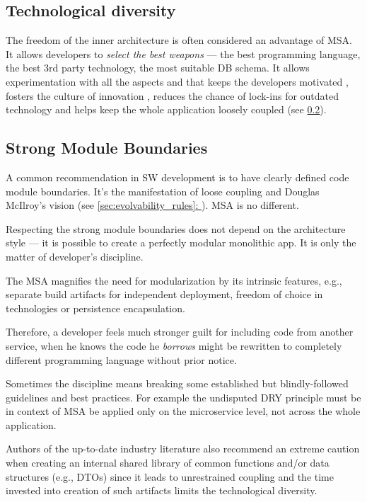 \documentclass[thesis=M,english,hidelinks]{FITthesis}[2012/10/20]
\newcommand*{\fullref}[1]{\hyperref[{#1}]{\autoref*{#1}: \textit{\nameref*{#1}}}}
\begin{document}
\subsection{Technological diversity}
The freedom of the inner architecture is often considered an advantage of \acrshort{MSA}. It allows developers to \textit{select the best weapons} --- the best programming language, the best 3rd party technology, the most suitable \acrshort{DB} schema. It allows experimentation with all the aspects and that keeps the developers motivated \cite{ms-building-ms, ms-3-pillars}, fosters the culture of innovation \cite{innovation-well-oiled-machine}, reduces the chance of lock-ins for outdated technology \cite{ms-building-ms} and helps keep the whole application loosely coupled (see \ref{sec:strong_boundaries}).

\subsection{Strong Module Boundaries}
\label{sec:strong_boundaries}
A common recommendation in \acrshort{SW} development is to have clearly defined code module boundaries. It's the manifestation of loose coupling and Douglas McIlroy's vision (see \fullref{sec:evolvability_rules}). \acrshort{MSA} is no different.

Respecting the strong module boundaries does not depend on the architecture style --- it is possible to create a perfectly modular monolithic app. It is only the matter of developer's discipline.

The \acrlong{MSA} magnifies the need for modularization by its intrinsic features, e.g., separate build artifacts for independent deployment, freedom of choice in technologies or persistence encapsulation.

Therefore, a developer feels much stronger guilt for including code from another service, when he knows the code he \textit{borrows} might be rewritten to completely different programming language without prior notice.

Sometimes the discipline means breaking some established but blindly-followed guidelines and best practices. For example the undisputed \acrfull{DRY} principle must be in context of \acrshort{MSA} be applied only on the microservice level, not across the whole application. 

Authors of the up-to-date industry literature \cite{ms-building-ms, ms-evolutionary-arch, ms-ca} also recommend an extreme caution when creating an internal shared library of common functions and/or data structures (e.g., \acrshort{DTO}s) since it leads to unrestrained coupling and the time invested into creation of such artifacts limits the technological diversity. 
\end{document}
